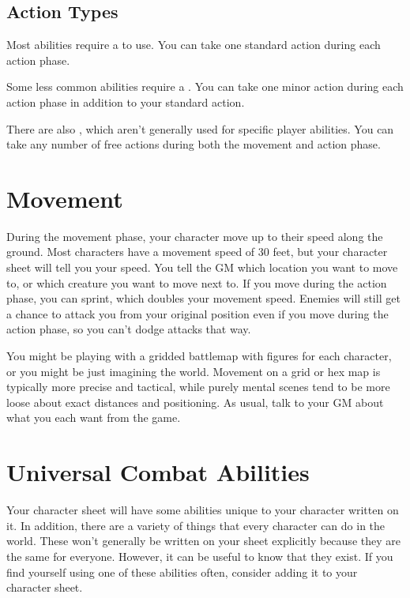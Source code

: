   \subsection{Action Types}
    Most abilities require a  to use.
    You can take one standard action during each action phase.

    Some less common abilities require a .
    You can take one minor action during each action phase in addition to your standard action.

    There are also , which aren't generally used for specific player abilities.
    You can take any number of free actions during both the movement and action phase.

\section{Movement}
  During the movement phase, your character move up to their speed along the ground.
  Most characters have a movement speed of 30 feet, but your character sheet will tell you your speed.
  You tell the GM which location you want to move to, or which creature you want to move next to.
  If you move during the action phase, you can sprint, which doubles your movement speed.
  Enemies will still get a chance to attack you from your original position even if you move during the action phase, so you can't dodge attacks that way.

  You might be playing with a gridded battlemap with figures for each character, or you might be just imagining the world.
  Movement on a grid or hex map is typically more precise and tactical, while purely mental scenes tend to be more loose about exact distances and positioning.
  As usual, talk to your GM about what you each want from the game.

\section{Universal Combat Abilities}
  Your character sheet will have some abilities unique to your character written on it.
  In addition, there are a variety of things that every character can do in the world.
  These won't generally be written on your sheet explicitly because they are the same for everyone.
  However, it can be useful to know that they exist.
  If you find yourself using one of these abilities often, consider adding it to your character sheet.

